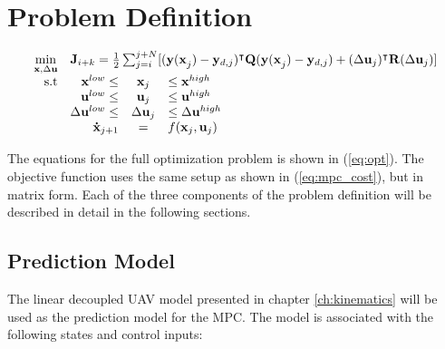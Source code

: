 \section{Problem Definition}

\begin{equation}
\label{eq:opt}
	\begin{array}{rrclcl}
		\displaystyle \min_{\mathbf{x}, \Delta \mathbf{u}} & \multicolumn{3}{l}{\mathbf{J}_{i+k} = \frac{1}{2} \sum_{j=i}^{j+N} [(\mathbf{y(\mathbf{x}}_j)-\mathbf{y}_{d,j})^\intercal \mathbf{Q}(\mathbf{y(\mathbf{x}}_j)-\mathbf{y}_{d,j}) + (\Delta\mathbf{u}_j)^\intercal \mathbf{R}(\Delta\mathbf{u}_j)]}\\
		\textrm{s.t}
		& \mathbf{x}^{low} \leq & \mathbf{x}_j & \leq \mathbf{x}^{high} \\
		& \mathbf{u}^{low} \leq & \mathbf{u}_j & \leq \mathbf{u}^{high} \\
		& \Delta\mathbf{u}^{low} \leq & \Delta\mathbf{u}_j & \leq \Delta\mathbf{u}^{high} \\
		&  \mathbf{\dot{x}}_{j+1} &= & f(\mathbf{x}_j,\mathbf{u}_j) 
	\end{array}
\end{equation}

The equations for the full optimization problem is shown in (\ref{eq:opt}). The objective function uses the same setup as shown in (\ref{eq:mpc_cost}), but in matrix form. Each of the three components of the problem definition will be described in detail in the following sections.


\subsection{Prediction Model}

The linear decoupled UAV model presented in chapter \ref{ch:kinematics} will be used as the prediction model for the MPC. The model is associated with the following states and control inputs:

